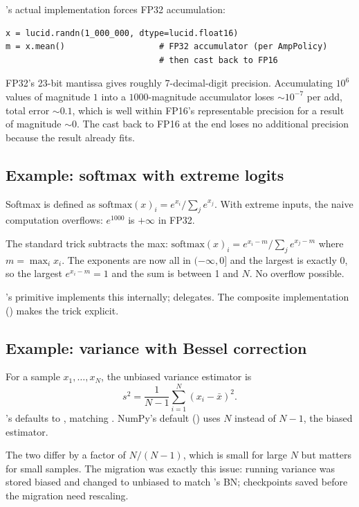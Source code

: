 \Lucid's actual implementation forces FP32 accumulation:

\begin{lstlisting}[style=lucid,language=LucidPython]
x = lucid.randn(1_000_000, dtype=lucid.float16)
m = x.mean()                   # FP32 accumulator (per AmpPolicy)
                               # then cast back to FP16
\end{lstlisting}

FP32's 23-bit mantissa gives roughly 7-decimal-digit precision.
Accumulating $10^6$ values of magnitude $1$ into a $1000$-magnitude
accumulator loses $\sim 10^{-7}$ per add, total error $\sim 0.1$,
which is well within FP16's representable precision for a result
of magnitude $\sim 0$. The cast back to FP16 at the end loses no
additional precision because the result already fits.

\subsection{Example: softmax with extreme logits}
\label{ssec:reductions:softmax_extreme}

Softmax is defined as $\text{softmax}(x)_i = e^{x_i} / \sum_j
e^{x_j}$. With extreme inputs, the naive computation overflows:
$e^{1000}$ is $+\infty$ in FP32.

The standard trick subtracts the max: $\text{softmax}(x)_i =
e^{x_i - m} / \sum_j e^{x_j - m}$ where $m = \max_i x_i$. The
exponents are now all in $(-\infty, 0]$ and the largest is
exactly 0, so the largest $e^{x_i - m} = 1$ and the sum is
between 1 and $N$. No overflow possible.

\Lucid's  primitive implements this internally;
 delegates. The composite
implementation () makes the trick
explicit.

\subsection{Example: variance with Bessel correction}
\label{ssec:reductions:var_bessel}

For a sample $x_1, \ldots, x_N$, the unbiased variance estimator
is
\[
s^2 = \frac{1}{N - 1} \sum_{i=1}^N (x_i - \bar{x})^2.
\]
\Lucid's  defaults to , matching
. NumPy's default () uses $N$ instead of
$N-1$, the biased estimator.

The two differ by a factor of $N/(N-1)$, which is small for large
$N$ but matters for small samples. The
 migration was exactly this issue:
running variance was stored biased and changed to unbiased to
match 's BN; checkpoints saved before the migration
need rescaling.

